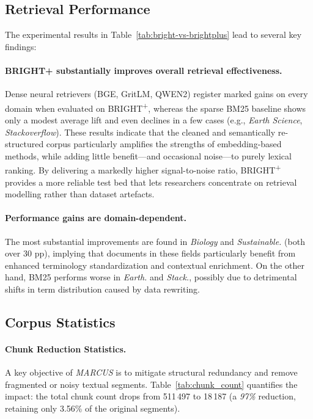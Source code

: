 \documentclass[11pt]{article}
\newcommand{\mymethod}{\emph{MARCUS}}
\begin{document}
\subsection{Retrieval Performance}
The experimental results in Table~\ref{tab:bright-vs-brightplus} lead to several key findings:

\paragraph{BRIGHT+ substantially improves overall retrieval effectiveness.}
Dense neural retrievers (BGE, GritLM, QWEN2) register marked gains on every domain when evaluated on BRIGHT\textsuperscript{+}, whereas the sparse BM25 baseline shows only a modest average lift and even declines in a few cases (e.g., \emph{Earth Science}, \emph{Stackoverflow}).  
These results indicate that the cleaned and semantically re-structured corpus particularly amplifies the strengths of embedding-based methods, while adding little benefit—and occasional noise—to purely lexical ranking.  
By delivering a markedly higher signal-to-noise ratio, BRIGHT\textsuperscript{+} provides a more reliable test bed that lets researchers concentrate on retrieval modelling rather than dataset artefacts.


\paragraph{Performance gains are domain-dependent.} The most substantial improvements are found in \emph{Biology} and \emph{Sustainable.} (both over 30 pp), implying that documents in these fields particularly benefit from enhanced terminology standardization and contextual enrichment. On the other hand, BM25 performs worse in \emph{Earth.} and \emph{Stack.}, possibly due to detrimental shifts in term distribution caused by data rewriting.



\subsection{Corpus Statistics}
\paragraph{Chunk Reduction Statistics.}
A key objective of \mymethod{} is to mitigate structural redundancy and remove fragmented or noisy textual segments.  
Table~\ref{tab:chunk_count} quantifies the impact: the total chunk count drops from 511\,497 to 18\,187 (a \emph{97\%} reduction, retaining only 3.56\% of the original segments).  
\end{document}
